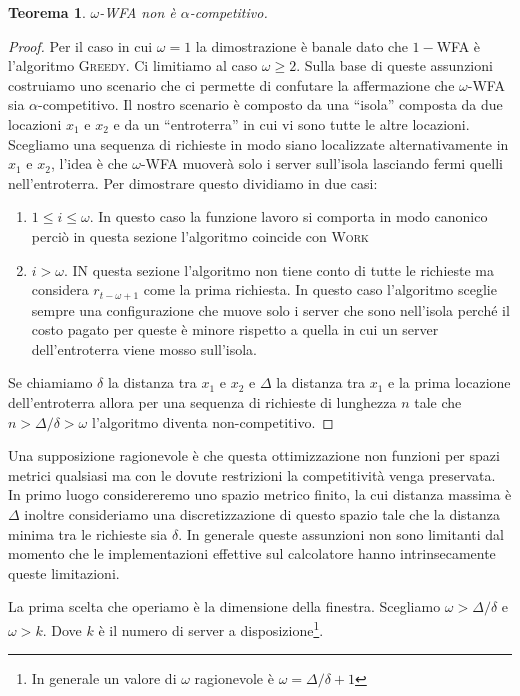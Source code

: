 \documentclass[a4paper, 10pt]{article}
\begin{document}
\newtheorem{noncomp}{Teorema} 
\begin{noncomp}
$\omega$-WFA non è $\alpha$-competitivo.
\end{noncomp}
\begin{proof}
Per il caso in cui $\omega = 1$ la dimostrazione è banale dato
che $1-$WFA è l'algoritmo \textsc{Greedy}. Ci limitiamo al caso $\omega \geq 2$.
Sulla base di queste assunzioni costruiamo uno scenario che ci permette di 
confutare la affermazione che $\omega$-WFA sia $\alpha$-competitivo. Il nostro 
scenario è composto da una ``isola'' composta da due locazioni $x_1$ e $x_2$ e 
da un ``entroterra'' in cui vi sono tutte le altre locazioni. Scegliamo una 
sequenza di richieste in modo siano localizzate alternativamente in $x_1$ e 
$x_2$, l'idea è che $\omega$-WFA muoverà solo i server sull'isola lasciando fermi 
quelli nell'entroterra. Per dimostrare questo dividiamo in due casi:
\begin{enumerate}
    \item $1 \leq i \leq \omega$. In questo caso la funzione lavoro si comporta in 
    modo canonico perciò in questa sezione l'algoritmo coincide con 
    \textsc{Work} 
    \item $i > \omega$. IN questa sezione l'algoritmo non tiene conto di tutte le 
    richieste ma considera $r_{t - \omega + 1}$ come la prima richiesta. In questo 
    caso l'algoritmo sceglie sempre una configurazione che muove solo i server 
    che sono nell'isola perché il costo pagato per queste è minore rispetto a 
    quella in cui un server dell'entroterra viene mosso sull'isola. 
\end{enumerate}
Se chiamiamo $\delta$ la distanza tra $x_1$ e $x_2$ e $\Delta$ la distanza tra 
$x_1$ e la prima locazione dell'entroterra allora per una sequenza di richieste
di lunghezza $n$ tale che $n > \Delta / \delta > \omega$ l'algoritmo diventa 
non-competitivo.
\end{proof}

Una supposizione ragionevole è che questa ottimizzazione non funzioni per spazi
metrici qualsiasi ma con le dovute restrizioni la competitività venga preservata.
In primo luogo considereremo uno spazio
metrico finito, la cui distanza massima è $\Delta$ inoltre consideriamo una
discretizzazione di questo spazio tale che la distanza minima tra le richieste
sia $\delta$. In generale queste assunzioni non sono limitanti dal momento che 
le implementazioni effettive sul calcolatore hanno intrinsecamente queste 
limitazioni.

La prima scelta che operiamo è la dimensione della finestra. 
Scegliamo $\omega > \Delta/\delta$ e $\omega > k$. Dove $k$ è il numero di 
server a disposizione\footnote{In generale un valore di $\omega$ ragionevole
è $\omega = \Delta / \delta + 1$}. 
\end{document}
